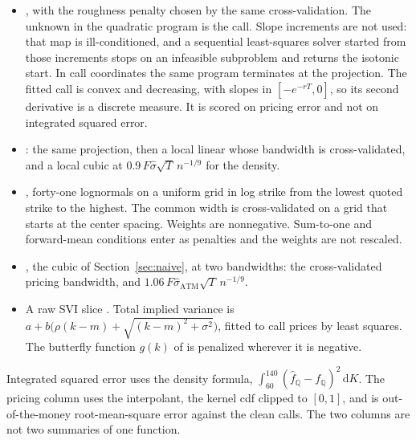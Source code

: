 \documentclass[preprint,12pt,authoryear,times]{elsarticle}
\newcommand{\Q}{\mathbb{Q}}
\begin{document}
\begin{itemize}
\item \citeauthor{yatchew2006}, with the roughness penalty chosen by the same cross-validation. The unknown in the quadratic program is the call. Slope increments are not used: that map is ill-conditioned, and a sequential least-squares solver started from those increments stops on an infeasible subproblem and returns the isotonic start. In call coordinates the same program terminates at the projection. The fitted call is convex and decreasing, with slopes in \([-e^{-rT},0]\), so its second derivative is a discrete measure. It is scored on pricing error and not on integrated squared error.
\item \citeauthor{aitsahalia2003}: the same projection, then a local linear whose bandwidth is cross-validated, and a local cubic at \(0.9\,F\hat\sigma\sqrt{T}\,n^{-1/9}\) for the density.
\item \citeauthor{bondarenko2003}, forty-one lognormals on a uniform grid in log strike from the lowest quoted strike to the highest. The common width is cross-validated on a grid that starts at the center spacing. Weights are nonnegative. Sum-to-one and forward-mean conditions enter as penalties and the weights are not rescaled.
\item \citeauthor{priestley1972}, the cubic of Section~\ref{sec:naive}, at two bandwidths: the cross-validated pricing bandwidth, and \(1.06\,F\hat\sigma_{\mathrm{ATM}}\sqrt{T}\,n^{-1/9}\).
\item A raw SVI slice \citep{gatheral2006}. Total implied variance is \(a+b\bigl(\rho(k-m)+\sqrt{(k-m)^2+\sigma^2}\bigr)\), fitted to call prices by least squares. The butterfly function \(g(k)\) of \citet{gatheraljacquier2014} is penalized wherever it is negative.
\end{itemize}

Integrated squared error uses the density formula, \(\int_{60}^{140}(\hat f_{\Q}-f_{\Q})^2\,\mathrm{d}K\). The pricing column uses the interpolant, the kernel cdf clipped to \([0,1]\), and is out-of-the-money root-mean-square error against the clean calls. The two columns are not two summaries of one function.
\end{document}
